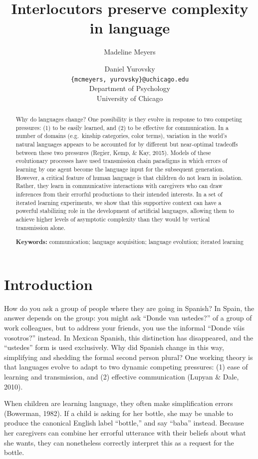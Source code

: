\documentclass[10pt, letterpaper]{article}
\title{Interlocutors preserve complexity in language}
\author{Madeline Meyers \and Daniel Yurovsky \\
        \texttt{\{mcmeyers, yurovsky\}@uchicago.edu} \\
       Department of Psychology \\ University of Chicago}
\begin{document}
\maketitle

\begin{abstract}
Why do languages change? One possibility is they evolve in response to
two competing pressures: (1) to be easily learned, and (2) to be
effective for communication. In a number of domains (e.g.~kinship
categories, color terms), variation in the world's natural languages
appears to be accounted for by different but near-optimal tradeoffs
between these two pressures (Regier, Kemp, \& Kay, 2015). Models of
these evolutionary processes have used transmission chain paradigms in
which errors of learning by one agent become the language input for the
subsequent generation. However, a critical feature of human language is
that children do not learn in isolation. Rather, they learn in
communicative interactions with caregivers who can draw inferences from
their errorful productions to their intended interests. In a set of
iterated learning experiments, we show that this supportive context can
have a powerful stabilizing role in the development of artificial
languages, allowing them to achieve higher levels of asymptotic
complexity than they would by vertical transmission alone.

\textbf{Keywords:}
communication; language acquisition; language evolution; iterated
learning
\end{abstract}

\section{Introduction}\label{introduction}

How do you ask a group of people where they are going in Spanish? In
Spain, the answer depends on the group: you might ask ``Donde van
ustedes?'' of a group of work colleagues, but to address your friends,
you use the informal ``Donde váis vosotros?'' instead. In Mexican
Spanish, this distinction has disappeared, and the ``ustedes'' form is
used exclusively. Why did Spanish change in this way, simplifying and
shedding the formal second person plural? One working theory is that
languages evolve to adapt to two dynamic competing pressures: (1) ease
of learning and transmission, and (2) effective communication (Lupyan \&
Dale, 2010).

When children are learning language, they often make simplification
errors (Bowerman, 1982). If a child is asking for her bottle, she may be
unable to produce the canonical English label ``bottle,'' and say
``baba'' instead. Because her caregivers can combine her errorful
utterance with their beliefs about what she wants, they can nonetheless
correctly interpret this as a request for the bottle.
\end{document}

